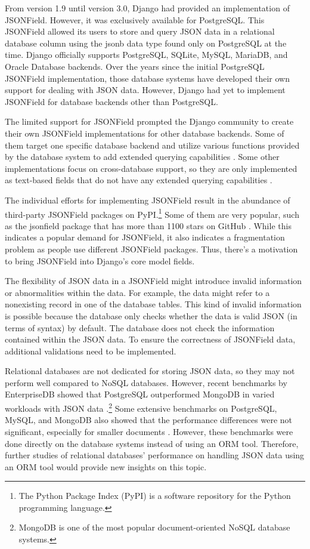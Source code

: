 From version 1.9 until version 3.0, Django had provided an implementation of
JSONField. However, it was exclusively available for PostgreSQL. This JSONField
allowed its users to store and query JSON data in a relational database column
using the jsonb data type found only on PostgreSQL at the time. Django
officially supports PostgreSQL, SQLite, MySQL, MariaDB, and Oracle Database
backends. Over the years since the initial PostgreSQL JSONField implementation,
those database systems have developed their own support for dealing with JSON
data. However, Django had yet to implement JSONField for database backends
other than PostgreSQL.

The limited support for JSONField prompted the Django community to create their
own JSONField implementations for other database backends. Some of them target
one specific database backend and utilize various functions provided by the
database system to add extended querying capabilities \cite{mysql_jsonfield}
\cite{oracle_jsonfield}. Some other implementations focus on cross-database
support, so they are only implemented as text-based fields that do not have any
extended querying capabilities \cite{ryan_jsonfield}.

The individual efforts for implementing JSONField result in the abundance of
third-party JSONField packages on PyPI.\footnote{The Python Package Index
(PyPI) is a software repository for the Python programming language.} Some
of them are very popular, such as the jsonfield package that has more than 1100
stars on GitHub \cite{ryan_jsonfield}. While this indicates a popular demand
for JSONField, it also indicates a fragmentation problem as people use
different JSONField packages. Thus, there's a motivation to bring JSONField
into Django's core model fields.

The flexibility of JSON data in a JSONField might introduce invalid information
or abnormalities within the data. For example, the data might refer to a
nonexisting record in one of the database tables. This kind of invalid
information is possible because the database only checks whether the data is
valid JSON (in terms of syntax) by default. The database does not check the
information contained within the JSON data. To ensure the correctness of
JSONField data, additional validations need to be implemented.

Relational databases are not dedicated for storing JSON data, so they may not
perform well compared to NoSQL databases. However, recent benchmarks by
EnterpriseDB showed that PostgreSQL outperformed MongoDB in varied workloads
with JSON data \cite{enterprisedb_benchmark}.\footnote{MongoDB is one of the
most popular document-oriented NoSQL database systems.} Some extensive
benchmarks on PostgreSQL, MySQL, and MongoDB also showed that the performance
differences were not significant, especially for smaller documents
\cite{dolgov_benchmark}. However, these benchmarks were done directly on the
database systems instead of using an ORM tool. Therefore, further studies of
relational databases' performance on handling JSON data using an ORM tool would
provide new insights on this topic.

